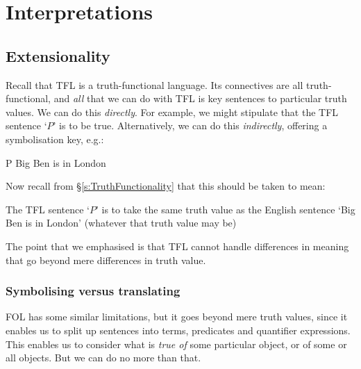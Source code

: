 \part{Interpretations}
\label{ch.semantics}


\chapter{Extensionality}\label{s:Interpretations}

Recall that TFL is a truth-functional language. Its connectives are all truth-functional, and \emph{all} that we can do with TFL is key sentences to particular truth values. We can do this \emph{directly}. For example, we might stipulate that the TFL sentence `$P$' is to be true. Alternatively, we can do this \emph{indirectly}, offering a symbolisation key, e.g.:
	\begin{ekey}
		\item[P] Big Ben is in London
	\end{ekey}
Now recall from \S\ref{s:TruthFunctionality} that this should be taken to mean:
	\begin{ebullet}
		\item The TFL sentence `$P$' is to take the same truth value as the English sentence `Big Ben is in London' (whatever that truth value may be)
	\end{ebullet}
The point that we emphasised is that TFL cannot handle differences in meaning that go beyond mere differences in truth value.


\section{Symbolising versus translating}
FOL has some similar limitations, but it goes beyond mere truth values, since it enables us to split up sentences into terms, predicates and quantifier expressions. This enables us to consider what is \emph{true of} some particular object, or of some or all objects. But we can do no more than that. 

